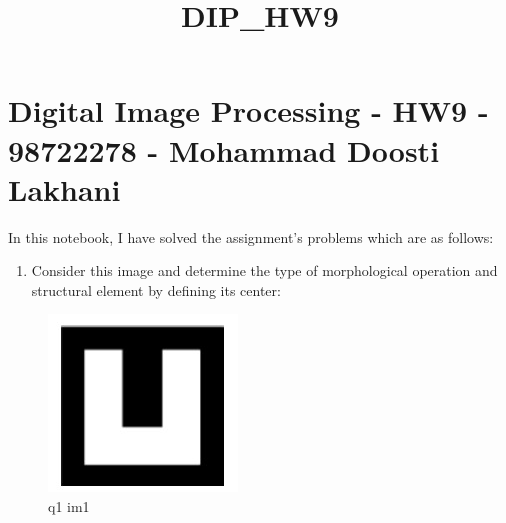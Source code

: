 \documentclass[11pt]{article}
\title{DIP\_HW9}
\makeatletter
\def\maxwidth{\ifdim\Gin@nat@width>\linewidth\linewidth
    \else\Gin@nat@width\fi}
\let\Oldincludegraphics\includegraphics
\renewcommand{\includegraphics}[1]{\Oldincludegraphics[width=.8\maxwidth]{#1}}
\providecommand{\tightlist}{%
      \setlength{\itemsep}{0pt}\setlength{\parskip}{0pt}}
\makeatother
\begin{document}
    
    
    \maketitle
    
    

    
    \hypertarget{digital-image-processing---hw9---98722278---mohammad-doosti-lakhani}{%
\section{Digital Image Processing - HW9 - 98722278 - Mohammad Doosti
Lakhani}\label{digital-image-processing---hw9---98722278---mohammad-doosti-lakhani}}

In this notebook, I have solved the assignment's problems which are as
follows:

\begin{enumerate}
\def\labelenumi{\arabic{enumi}.}
\tightlist
\item
  Consider this image and determine the type of morphological operation
  and structural element by defining its center:
\end{enumerate}

\begin{figure}
\centering
\includegraphics{wiki/1_1.jpg}
\caption{q1 im1}
\end{figure}
\end{document}
